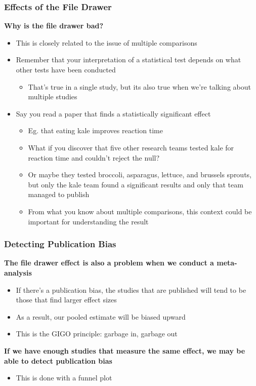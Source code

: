 \documentclass[10pt, block=fill]{beamer}
\begin{document}
\begin{frame}
    \frametitle{Effects of the File Drawer}
    
    \textbf{Why is the file drawer bad?}
    \begin{itemize}
        \item This is closely related to the issue of multiple comparisons
        \item Remember that your interpretation of a statistical test depends on what other tests have been conducted
        \begin{itemize}
            \item That's true in a single study, but its also true when we're talking about multiple studies
        \end{itemize}
        \item Say you read a paper that finds a statistically significant effect
        \begin{itemize}
            \item Eg. that eating kale improves reaction time
            \item What if you discover that five other research teams tested kale for reaction time and couldn't reject the null?
            \item Or maybe they tested broccoli, asparagus, lettuce, and brussels sprouts, but only the kale team found a significant results and only that team managed to publish
            \item From what you know about multiple comparisons, this context could be important for understanding the result
        \end{itemize}
    \end{itemize}

\end{frame}


\begin{frame}
    \frametitle{Detecting Publication Bias}
    
    \textbf{The file drawer effect is also a problem when we conduct a meta-analysis}
    \begin{itemize}
        \item If there's a publication bias, the studies that are published will tend to be those that find larger effect sizes
        \item As a result, our pooled estimate will be biased upward
        \item This is the GIGO principle: garbage in, garbage out
    \end{itemize}
    
    \vspace{0.25in}
    
    \textbf{If we have enough studies that measure the same effect, we may be able to detect publication bias}
    \begin{itemize}
        \item This is done with a funnel plot
    \end{itemize}
\end{frame}
\end{document}

